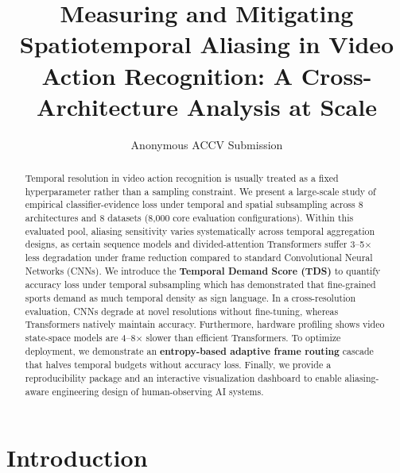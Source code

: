 \documentclass[runningheads]{llncs}
\newcommand{\TDS}{\textsc{TDS}}
\begin{document}
\raggedbottom

\title{Measuring and Mitigating Spatiotemporal Aliasing in Video Action Recognition: A Cross-Architecture Analysis at Scale}


\author{Anonymous ACCV Submission}
\institute{}
\maketitle

\begin{abstract}
Temporal resolution in video action recognition is usually treated as a fixed hyperparameter rather than a sampling constraint. We present a large-scale study of empirical classifier-evidence loss under temporal and spatial subsampling across 8 architectures and 8 datasets (8,000 core evaluation configurations). Within this evaluated pool, aliasing sensitivity varies systematically across temporal aggregation designs, as certain sequence models and divided-attention Transformers suffer 3--5$\times$ less degradation under frame reduction compared to standard Convolutional Neural Networks (CNNs). We introduce the \textbf{Temporal Demand Score (\TDS{})} to quantify accuracy loss under temporal subsampling which has demonstrated that fine-grained sports demand as much temporal density as sign language. In a cross-resolution evaluation, CNNs degrade at novel resolutions without fine-tuning, whereas Transformers natively maintain accuracy. Furthermore, hardware profiling shows video state-space models are 4--8$\times$ slower than efficient Transformers. To optimize deployment, we demonstrate an \textbf{entropy-based adaptive frame routing} cascade that halves temporal budgets without accuracy loss. Finally, we provide a reproducibility package and an interactive visualization dashboard to enable aliasing-aware engineering design of human-observing AI systems.
\end{abstract}

\section{Introduction}
\label{sec:intro}
\end{document}

